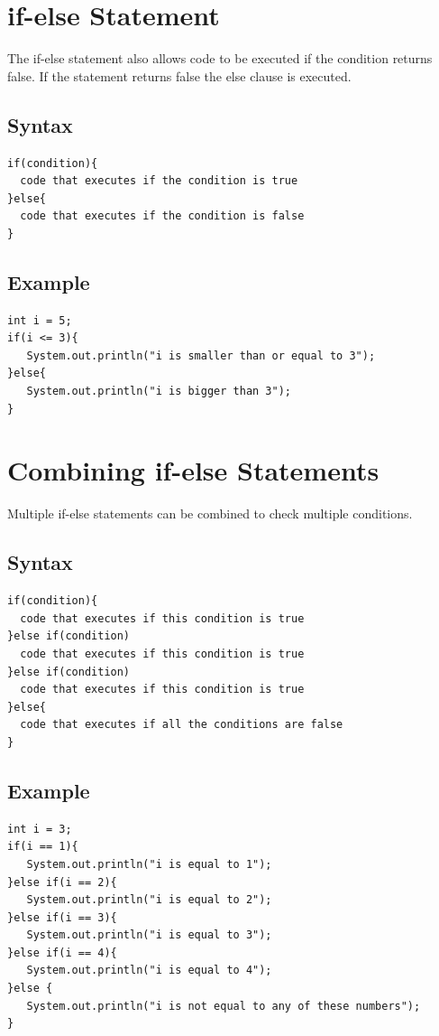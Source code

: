 \documentclass[a4paper]{article}
\begin{document}
\section*{if-else Statement}
The if-else statement also allows code to be executed if the condition returns
false. If the statement returns false the else clause is executed.

\subsection*{Syntax}
\begin{lstlisting}
if(condition){
  code that executes if the condition is true
}else{
  code that executes if the condition is false
}
\end{lstlisting}

\newpage

\subsection*{Example}
\begin{lstlisting}
int i = 5;
if(i <= 3){
   System.out.println("i is smaller than or equal to 3");
}else{
   System.out.println("i is bigger than 3");
}
\end{lstlisting}

\section*{Combining if-else Statements}
Multiple if-else statements can be combined to check multiple conditions.

\subsection*{Syntax}
\begin{lstlisting}
if(condition){
  code that executes if this condition is true
}else if(condition)
  code that executes if this condition is true
}else if(condition)
  code that executes if this condition is true
}else{
  code that executes if all the conditions are false
}
\end{lstlisting}

\subsection*{Example}
\begin{lstlisting}
int i = 3;
if(i == 1){
   System.out.println("i is equal to 1");
}else if(i == 2){
   System.out.println("i is equal to 2");
}else if(i == 3){
   System.out.println("i is equal to 3");
}else if(i == 4){
   System.out.println("i is equal to 4");
}else {
   System.out.println("i is not equal to any of these numbers");
}
\end{lstlisting}
\end{document}
